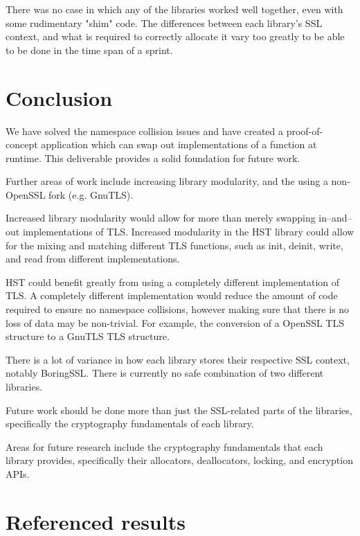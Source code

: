 \documentclass[12pt,oneside]{report}
\begin{document}
There was no case in which any of the libraries worked well together, even with
some rudimentary "shim" code. The differences between each library's SSL
context, and what is required to correctly allocate it vary too greatly to be
able to be done in the time span of a sprint.

\cleardoublepage

\chapter{Conclusion}
\label{sec:con}

We have solved the namespace collision issues and have created a
proof-of-concept application which can swap out implementations of a function at
runtime. This deliverable provides a solid foundation for future work.

Further areas of work include increasing library modularity, and the using a
non-OpenSSL fork (e.g. GnuTLS).

Increased library modularity would allow for more than merely swapping
in--and--out implementations of TLS. Increased modularity in the HST library
could allow for the mixing and matching different TLS functions, such as init,
deinit, write, and read from different implementations.

HST could benefit greatly from using a completely different implementation of
TLS. A completely different implementation would reduce the amount of code
required to ensure no namespace collisions, however making sure that there is no
loss of data may be non-trivial. For example, the conversion of a OpenSSL TLS
structure to a GnuTLS TLS structure.

There is a lot of variance in how each library stores their respective SSL
context, notably BoringSSL. There is currently no safe combination of two
different libraries.

Future work should be done more than just the SSL-related parts of the
libraries, specifically the cryptography fundamentals of each library.

Areas for future research include the cryptography fundamentals that each
library provides, specifically their allocators, deallocators, locking, and
encryption APIs.

\cleardoublepage


 
\cleardoublepage

\appendix
\chapter{Referenced results}
\end{document}
